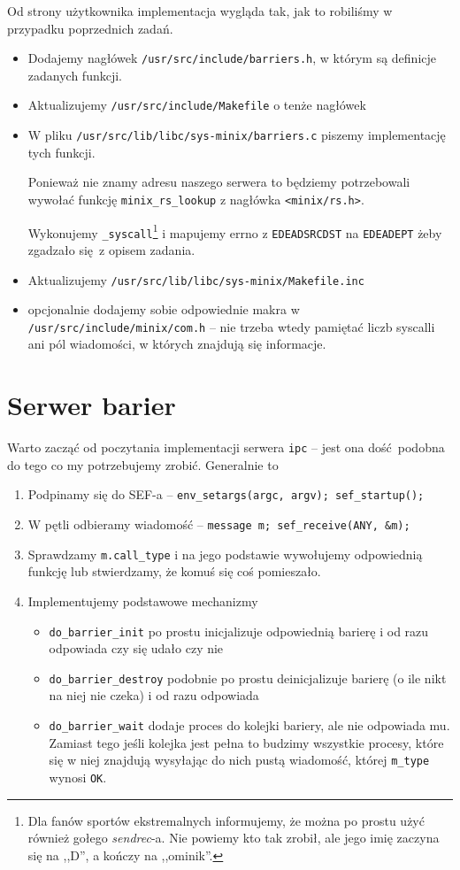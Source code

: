 Od strony użytkownika implementacja wygląda tak, jak to robiliśmy w przypadku poprzednich zadań.
\begin{itemize}
	\item Dodajemy nagłówek \texttt{/usr/src/include/barriers.h}, w którym są definicje zadanych funkcji.
	\item Aktualizujemy \texttt{/usr/src/include/Makefile} o tenże nagłówek
	\item W pliku \texttt{/usr/src/lib/libc/sys-minix/barriers.c} piszemy implementację tych funkcji.

	      Ponieważ nie znamy adresu naszego serwera to będziemy potrzebowali wywołać funkcję \texttt{minix\_rs\_lookup} z nagłówka \texttt{<minix/rs.h>}.

	      Wykonujemy \texttt{\_syscall}\footnote{Dla fanów sportów ekstremalnych informujemy, że można po prostu użyć również gołego \textit{sendrec}-a. Nie powiemy kto tak zrobił, ale jego imię zaczyna się na ,,D'', a kończy na ,,ominik''. } i mapujemy errno z \texttt{EDEADSRCDST} na \texttt{EDEADEPT} żeby zgadzało się z opisem zadania.
	\item Aktualizujemy \texttt{/usr/src/lib/libc/sys-minix/Makefile.inc}
	\item opcjonalnie dodajemy sobie odpowiednie makra w \texttt{/usr/src/include/minix/com.h} -- nie trzeba wtedy pamiętać liczb syscalli ani pól wiadomości, w których znajdują się informacje.
\end{itemize}

\section{Serwer barier}
Warto zacząć od poczytania implementacji serwera \texttt{ipc} -- jest ona dość podobna do tego co my potrzebujemy zrobić. Generalnie to
\begin{enumerate}
	\item Podpinamy się do SEF-a -- \texttt{env\_setargs(argc, argv); sef\_startup();}
	\item W pętli odbieramy wiadomość -- \texttt{message m; sef\_receive(ANY, \&m);}
	\item Sprawdzamy \texttt{m.call\_type} i na jego podstawie wywołujemy odpowiednią funkcję lub stwierdzamy, że komuś się coś pomieszało.
	\item Implementujemy podstawowe mechanizmy
	      \begin{itemize}
		      \item \texttt{do\_barrier\_init} po prostu inicjalizuje odpowiednią barierę i od razu odpowiada czy się udało czy nie
		      \item \texttt{do\_barrier\_destroy} podobnie po prostu deinicjalizuje barierę (o ile nikt na niej nie czeka) i od razu odpowiada
		      \item \texttt{do\_barrier\_wait} dodaje proces do kolejki bariery, ale nie odpowiada mu.
		            Zamiast tego jeśli kolejka jest pełna to budzimy wszystkie procesy, które się w niej znajdują wysyłając do nich pustą wiadomość, której \texttt{m\_type} wynosi \texttt{OK}.
	      \end{itemize}

\end{enumerate}

